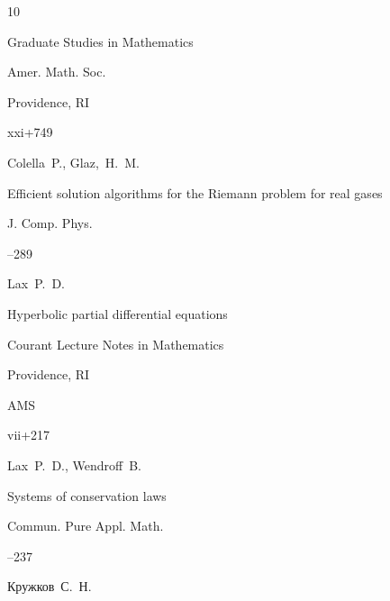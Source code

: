 \begin{thebibliography}{10}

\serial Graduate Studies in Mathematics


\publ Amer. Math. Soc.

\publaddr Providence, RI

\totalpages xxi+749





\by Colella~P., Glaz,~H.~M.

\paper Efficient solution algorithms for the Riemann problem for real gases

\jour J. Comp. Phys.



--289








\by Lax~P.~D.

\book Hyperbolic partial differential equations


\serial Courant Lecture Notes in Mathematics 


\publaddr Providence, RI

\publ AMS

\totalpages vii+217 





\by Lax~P.~D., Wendroff~B.

\paper Systems of conservation laws

\jour Commun. Pure Appl. Math. 



--237








\by Кружков~С.~Н.


\end{thebibliography}
